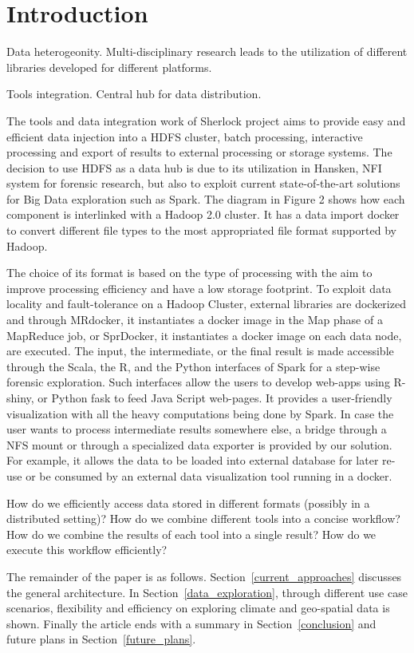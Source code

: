 \section{Introduction}
\label{introduction}

Data heterogeonity.
Multi-disciplinary research leads to the utilization of different libraries developed for different platforms.

Tools integration.
Central hub for data distribution.

The tools and data integration work of Sherlock project aims to provide easy and efficient data injection
into a HDFS cluster, batch processing, interactive processing and export of results to external processing
or storage systems. The decision to use HDFS as a data hub is due to its utilization in Hansken, NFI system
for forensic research, but also to exploit current state-of-the-art solutions for Big Data exploration such
as Spark. The diagram in Figure 2 shows how each component is interlinked with a Hadoop 2.0 cluster. It has
a data import docker to convert different file types to the most appropriated file format supported by Hadoop.

The choice of its format is based on the type of processing with the aim to improve processing efficiency
and have a low storage footprint. To exploit data locality and fault-tolerance on a Hadoop Cluster, external
libraries are dockerized and through MRdocker, it instantiates a docker image in the Map phase of a MapReduce
job, or SprDocker, it instantiates a docker image on each data node, are executed. The input, the intermediate,
or the final result is made accessible through the Scala, the R, and the Python interfaces of Spark for a
step-wise forensic exploration. Such interfaces allow the users to develop web-apps using R-shiny, or Python
fask to feed Java Script web-pages. It provides a user-friendly visualization with all the heavy computations
being done by Spark. In case the user wants to process intermediate results somewhere else, a bridge through
a NFS mount or through a specialized data exporter is provided by our solution. For example, it allows the
data to be loaded into external database for later re-use or be consumed by an external data visualization
tool running in a docker. 

How do we efficiently access data stored in different formats (possibly in a distributed setting)?
How do we combine different tools into a concise workflow? 
How do we combine the results of each tool into a single result? 
How do we execute this workflow efficiently? 

The remainder of the paper is as follows. Section~\ref{current_approaches} discusses the general
architecture. In Section~\ref{data_exploration}, through different use case scenarios, flexibility
and efficiency on exploring climate and geo-spatial data is shown. Finally the article ends with
a summary in Section~\ref{conclusion} and future plans in Section~\ref{future_plans}.

